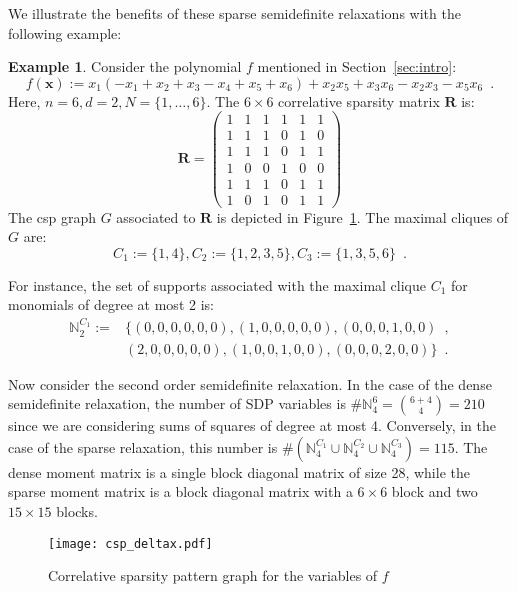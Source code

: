 \documentclass[a4paper,10pt]{article}
\newcommand{\mons}[2]{\N_{#1}^{#2}}
\newcommand{\N}{\mathbb{N}}
\newcommand{\x}{\mathbf{x}}
\theoremstyle{plain}
\theoremstyle{definition}
\newtheorem{example}{Example}
\theoremstyle{remark}
\begin{document}
We illustrate the benefits of these sparse semidefinite relaxations with the following example:
\begin{example}
\label{ex:sparse}
Consider the polynomial $f$ mentioned in Section~\ref{sec:intro}:
\[ f(\x) := x_1 ( - x_1 +  x_2 +  x_3  - x_4 +  x_5 +  x_6) 
+ x_2 x_5 + x_3 x_6 - x_2 x_3  - x_5 x_6\enspace. \] 
Here, $n = 6, d = 2, N = \{1,\dots, 6 \}$. The $6 \times 6$ correlative sparsity matrix $\mathbf{R}$ is:
\[
\mathbf{R} = 
\begin{pmatrix}
  1 & 1 & 1 & 1 & 1 & 1 \\
  1 & 1 & 1 & 0 & 1 & 0 \\
  1 & 1 & 1 & 0 & 1 & 1 \\
  1 & 0 & 0 & 1 & 0 & 0 \\
  1 & 1 & 1 & 0 & 1 & 1 \\
  1 & 0 & 1 & 0 & 1 & 1 
 \end{pmatrix}
\]
The csp graph $G$ associated to $\mathbf{R}$ is depicted in Figure~\ref{fig:csp_deltax}. The maximal cliques of $G$ are:
\[ C_1 := \{1, 4\}, C_2 := \{1, 2, 3, 5\}, C_3 := \{1, 3, 5, 6\}\enspace. \]

For instance, the set of supports associated with the maximal clique $C_1$ for monomials of degree at most 2 is:
\begin{align*}
\mons{2}{C_1} := & \{ (0, 0, 0, 0, 0, 0), (1, 0, 0, 0, 0, 0),  (0, 0, 0, 1, 0, 0)\enspace, \\
                &(2, 0, 0, 0, 0, 0), (1, 0, 0, 1, 0, 0), (0, 0, 0, 2, 0, 0) \}\enspace. 
\end{align*}

Now consider the second order semidefinite relaxation. In the case of the dense semidefinite relaxation, the number of SDP variables is $\#\mons{4}{6} = \binom{6 + 4}{4} = 210$ since we are considering sums of squares of degree at most 4.
Conversely, in the case of the sparse relaxation, this number is $\#( \mons{4}{C_1} \cup \mons{4}{C_2} \cup \mons{4}{C_3}) = 115 $. The dense moment matrix is a single block diagonal matrix of size 28, while the sparse moment matrix is a block diagonal matrix with a $6 \times 6$ block and two $15 \times 15$ blocks.


\begin{figure}[!ht]	
\begin{center}
\texttt{[image: csp\_deltax.pdf]}
\caption{Correlative sparsity pattern graph for the variables of $f$}
\label{fig:csp_deltax}
\end{center}
\end{figure}
\end{example}
\end{document}
